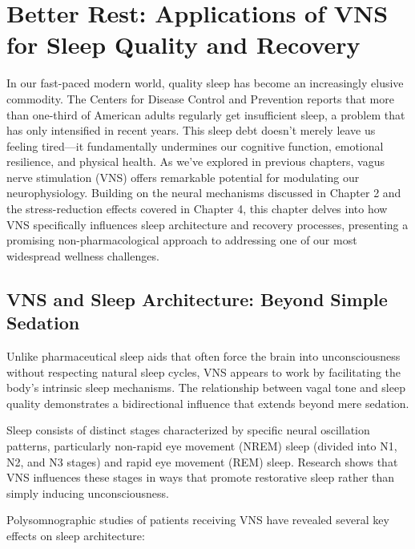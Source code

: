 \documentclass[
  Letterpaper,
]{scrbook}
\begin{document}

\chapter{Better Rest: Applications of VNS for Sleep Quality and
Recovery}\label{better-rest-applications-of-vns-for-sleep-quality-and-recovery}

In our fast-paced modern world, quality sleep has become an increasingly
elusive commodity. The Centers for Disease Control and Prevention
reports that more than one-third of American adults regularly get
insufficient sleep, a problem that has only intensified in recent years.
This sleep debt doesn't merely leave us feeling tired---it fundamentally
undermines our cognitive function, emotional resilience, and physical
health. As we've explored in previous chapters, vagus nerve stimulation
(VNS) offers remarkable potential for modulating our neurophysiology.
Building on the neural mechanisms discussed in Chapter 2 and the
stress-reduction effects covered in Chapter 4, this chapter delves into
how VNS specifically influences sleep architecture and recovery
processes, presenting a promising non-pharmacological approach to
addressing one of our most widespread wellness challenges.

\section{VNS and Sleep Architecture: Beyond Simple
Sedation}\label{vns-and-sleep-architecture-beyond-simple-sedation}

Unlike pharmaceutical sleep aids that often force the brain into
unconsciousness without respecting natural sleep cycles, VNS appears to
work by facilitating the body's intrinsic sleep mechanisms. The
relationship between vagal tone and sleep quality demonstrates a
bidirectional influence that extends beyond mere sedation.

Sleep consists of distinct stages characterized by specific neural
oscillation patterns, particularly non-rapid eye movement (NREM) sleep
(divided into N1, N2, and N3 stages) and rapid eye movement (REM) sleep.
Research shows that VNS influences these stages in ways that promote
restorative sleep rather than simply inducing unconsciousness.

Polysomnographic studies of patients receiving VNS have revealed several
key effects on sleep architecture:
\end{document}
